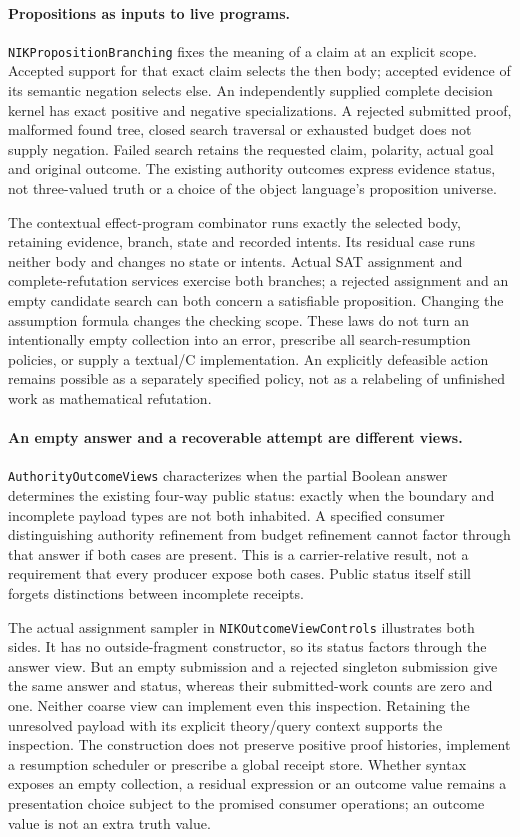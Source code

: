 \documentclass[11pt]{article}
\theoremstyle{definition}
\theoremstyle{remark}
\begin{document}
\paragraph{Propositions as inputs to live programs.}
\nolinkurl{NIKPropositionBranching} fixes the meaning of a claim at an
explicit scope. Accepted support for that exact claim selects the then body;
accepted evidence of its semantic negation selects else. An independently
supplied complete decision kernel has exact positive and negative
specializations. A rejected submitted proof, malformed found tree, closed
search traversal or exhausted budget does not supply negation. Failed search
retains the requested claim, polarity, actual goal and original outcome.
The existing authority outcomes express evidence status, not three-valued
truth or a choice of the object language's proposition universe.

The contextual effect-program combinator runs exactly the selected body,
retaining evidence, branch, state and recorded intents. Its residual case
runs neither body and changes no state or intents. Actual SAT assignment and
complete-refutation services exercise both branches; a rejected assignment
and an empty candidate search can both concern a satisfiable proposition.
Changing the assumption formula changes the checking scope. These laws do
not turn an intentionally empty collection into an error, prescribe all
search-resumption policies, or supply a textual/C implementation. An
explicitly defeasible action remains possible as a separately specified
policy, not as a relabeling of unfinished work as mathematical refutation.

\paragraph{An empty answer and a recoverable attempt are different views.}
\nolinkurl{AuthorityOutcomeViews} characterizes when the partial Boolean
answer determines the existing four-way public status: exactly when the
boundary and incomplete payload types are not both inhabited. A specified
consumer distinguishing authority refinement from budget refinement cannot
factor through that answer if both cases are present. This is a
carrier-relative result, not a requirement that every producer expose both
cases. Public status itself still forgets distinctions between incomplete
receipts.

The actual assignment sampler in \nolinkurl{NIKOutcomeViewControls}
illustrates both sides. It has no outside-fragment constructor, so its
status factors through the answer view. But an empty submission and a
rejected singleton submission give the same answer and status, whereas
their submitted-work counts are zero and one. Neither coarse view can
implement even this inspection. Retaining the unresolved payload with its
explicit theory/query context supports the inspection. The construction
does not preserve positive proof histories, implement a resumption
scheduler or prescribe a global receipt store. Whether syntax exposes an
empty collection, a residual expression or an outcome value remains a
presentation choice subject to the promised consumer operations; an
outcome value is not an extra truth value.
\end{document}
